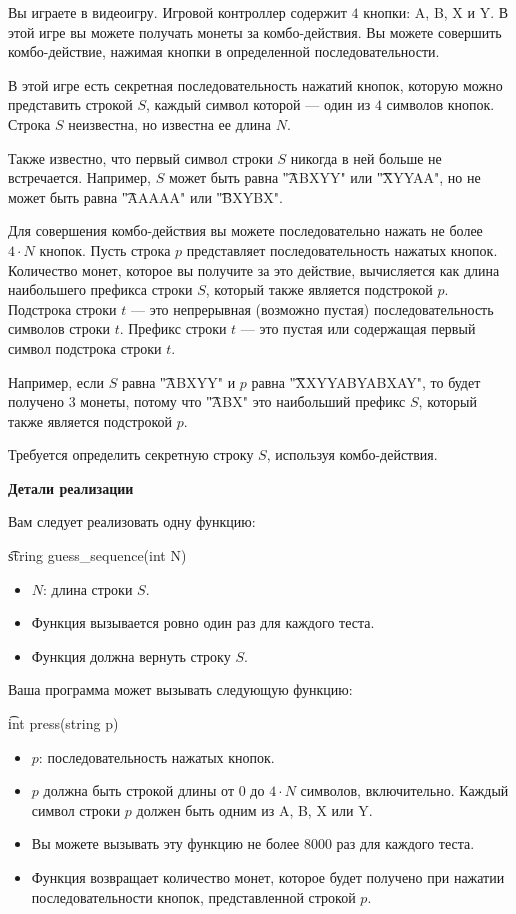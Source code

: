 Вы играете в видеоигру. Игровой контроллер содержит $4$ кнопки: A, B, X и Y. В этой игре вы можете получать монеты за комбо-действия. Вы можете совершить комбо-действие, нажимая кнопки в определенной последовательности.

В этой игре есть секретная последовательность нажатий кнопок, которую можно представить строкой $S$, каждый символ которой --- один из $4$ символов кнопок. Строка $S$ неизвестна, но известна ее длина $N$.

Также известно, что первый символ строки $S$ никогда в ней больше не встречается. Например, $S$ может быть равна \t{"ABXYY"} или \t{"XYYAA"}, но не может быть равна \t{"AAAAA"} или \t{"BXYBX"}.

Для совершения комбо-действия вы можете последовательно нажать не более $4 \cdot N$ кнопок. Пусть строка $p$ представляет последовательность нажатых кнопок. Количество монет, которое вы получите за это действие, вычисляется как длина наибольшего префикса строки $S$, который также является подстрокой $p$. Подстрока строки $t$ --- это непрерывная (возможно пустая) последовательность символов строки $t$. Префикс строки $t$ --- это пустая или содержащая первый символ подстрока строки $t$.

Например, если $S$ равна \t{"ABXYY"} и $p$ равна \t{"XXYYABYABXAY"}, то будет получено $3$ монеты, потому что \t{"ABX"} это наибольший префикс $S$, который также является подстрокой $p$.

Требуется определить секретную строку $S$, используя комбо-действия.

\bf{Детали реализации}

Вам следует реализовать одну функцию:

\t{string guess_sequence(int N)}

\begin{itemize}
\item $N$: длина строки $S$.
\item Функция вызывается ровно один раз для каждого теста.
\item Функция должна вернуть строку $S$.
\end{itemize}

Ваша программа может вызывать следующую функцию:

\t{int press(string p)}

\begin{itemize}
\item $p$: последовательность нажатых кнопок.
\item $p$ должна быть строкой длины от $0$ до $4 \cdot N$ символов, включительно. Каждый символ строки $p$ должен быть одним из A, B, X или Y.
\item Вы можете вызывать эту функцию не более $8000$ раз для каждого теста.
\item Функция возвращает количество монет, которое будет получено при нажатии последовательности кнопок, представленной строкой $p$.
\end{itemize}


